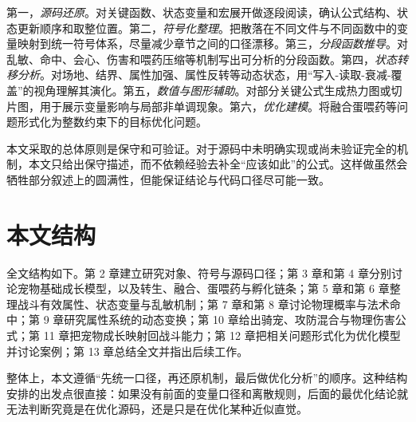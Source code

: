 第一，\emph{源码还原}。对关键函数、状态变量和宏展开做逐段阅读，确认公式结构、状态更新顺序和取整位置。第二，\emph{符号化整理}。把散落在不同文件与不同函数中的变量映射到统一符号体系，尽量减少章节之间的口径漂移。第三，\emph{分段函数推导}。对乱敏、命中、会心、伤害和喂药压缩等机制写出可分析的分段函数。第四，\emph{状态转移分析}。对场地、结界、属性加强、属性反转等动态状态，用“写入-读取-衰减-覆盖”的视角理解其演化。第五，\emph{数值与图形辅助}。对部分关键公式生成热力图或切片图，用于展示变量影响与局部非单调现象。第六，\emph{优化建模}。将融合蛋喂药等问题形式化为整数约束下的目标优化问题。

本文采取的总体原则是保守和可验证。对于源码中未明确实现或尚未验证完全的机制，本文只给出保守描述，而不依赖经验去补全“应该如此”的公式。这样做虽然会牺牲部分叙述上的圆满性，但能保证结论与代码口径尽可能一致。

\section{本文结构}

全文结构如下。第 2 章建立研究对象、符号与源码口径；第 3 章和第 4 章分别讨论宠物基础成长模型，以及转生、融合、蛋喂药与孵化链条；第 5 章和第 6 章整理战斗有效属性、状态变量与乱敏机制；第 7 章和第 8 章讨论物理概率与法术命中；第 9 章研究属性系统的动态变换；第 10 章给出骑宠、攻防混合与物理伤害公式；第 11 章把宠物成长映射回战斗能力；第 12 章把相关问题形式化为优化模型并讨论案例；第 13 章总结全文并指出后续工作。

整体上，本文遵循“先统一口径，再还原机制，最后做优化分析”的顺序。这种结构安排的出发点很直接：如果没有前面的变量口径和离散规则，后面的最优化结论就无法判断究竟是在优化源码，还是只是在优化某种近似直觉。

